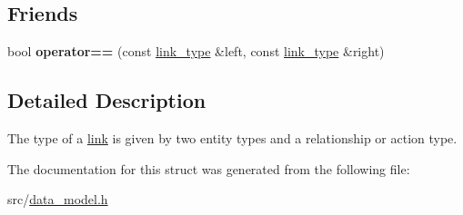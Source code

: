 \subsection*{Friends}
\begin{DoxyCompactItemize}
\item 
\mbox{\label{structtricl_1_1link__type_ae75460e218908d70af1163248317096e}} 
bool {\bfseries operator==} (const \hyperlink{structtricl_1_1link__type}{link\+\_\+type} \&left, const \hyperlink{structtricl_1_1link__type}{link\+\_\+type} \&right)
\end{DoxyCompactItemize}


\subsection{Detailed Description}
The type of a \hyperlink{structtricl_1_1link}{link} is given by two entity types and a relationship or action type. 

The documentation for this struct was generated from the following file\+:\begin{DoxyCompactItemize}
\item 
src/\hyperlink{data__model_8h}{data\+\_\+model.\+h}\end{DoxyCompactItemize}
